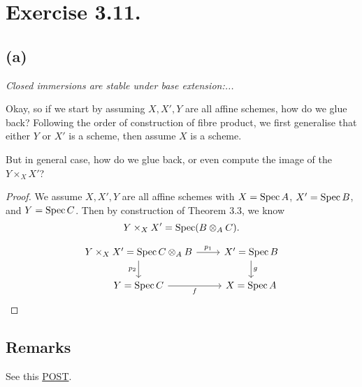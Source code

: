 \section{Exercise 3.11.}

\subsection{(a)}
\textit{Closed immersions are stable under base extension:...}

Okay, so if we start by assuming $X,X',Y$ are all affine schemes, how do we glue back? Following the order of construction of fibre product, we first generalise that either $Y$ or $X'$ is a scheme, then assume $X$ is a scheme. 

But in general case, how do we glue back, or even compute the image of the $Y\times_{X}X'$?

\begin{proof}
    We assume $X,X',Y$ are all affine schemes with $X=\operatorname{Spec} A$, $X'=\operatorname{Spec} B$, and $Y=\operatorname{Spec} C$. Then by construction of Theorem 3.3, we know 
    \[Y\times_{X}X'=\operatorname{Spec} (B\otimes_A C).\]

\[\begin{tikzcd}
	{Y\times_{X}X'=\operatorname{Spec} C\otimes_{A}B} & {X'=\operatorname{Spec} B} \\
	{Y=\operatorname{Spec} C} & {X=\operatorname{Spec} A}
	\arrow["{p_1}", from=1-1, to=1-2]
	\arrow["{p_2}"', from=1-1, to=2-1]
	\arrow["g", from=1-2, to=2-2]
	\arrow["f"', from=2-1, to=2-2]
\end{tikzcd}\]

\end{proof}

\subsection{Remarks}

See this \href{https://math.stackexchange.com/questions/1079356/closed-immersions-are-stable-under-base-change}{POST}.